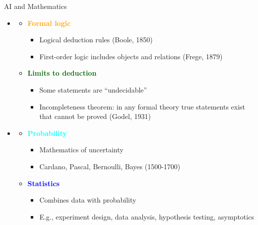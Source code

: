 \documentclass[
  10pt,
  ignorenonframetext,
]{beamer}
\providecommand{\tightlist}{%
  \setlength{\itemsep}{0pt}\setlength{\parskip}{0pt}}
\begin{document}
\begin{frame}{AI and Mathematics}
\label{ai-and-mathematics}
\begin{itemize}
\tightlist
\item
  \textbf{\textcolor{red}{\textcolor{black}{}}}

  \begin{itemize}
  \tightlist
  \item
    \textbf{\textcolor{orange}{Formal logic}}

    \begin{itemize}
    \tightlist
    \item
      Logical deduction rules (Boole, 1850)
    \item
      First-order logic includes objects and relations (Frege, 1879)
    \end{itemize}
  \item
    \textbf{\textcolor{darkgreen}{Limits to deduction}}

    \begin{itemize}
    \tightlist
    \item
      Some statements are ``undecidable''
    \item
      Incompleteness theorem: in any formal theory true statements exist
      that cannot be proved (Godel, 1931)
    \end{itemize}
  \end{itemize}
\item
  \textbf{\textcolor{teal}{\textcolor{black}{}}}

  \begin{itemize}
  \tightlist
  \item
    \textbf{\textcolor{cyan}{Probability}}

    \begin{itemize}
    \tightlist
    \item
      Mathematics of uncertainty
    \item
      Cardano, Pascal, Bernoulli, Bayes (1500-1700)
    \end{itemize}
  \item
    \textbf{\textcolor{blue}{Statistics}}

    \begin{itemize}
    \tightlist
    \item
      Combines data with probability
    \item
      E.g., experiment design, data analysis, hypothesis testing,
      asymptotics
    \end{itemize}
  \end{itemize}
\end{itemize}
\end{frame}
\end{document}
